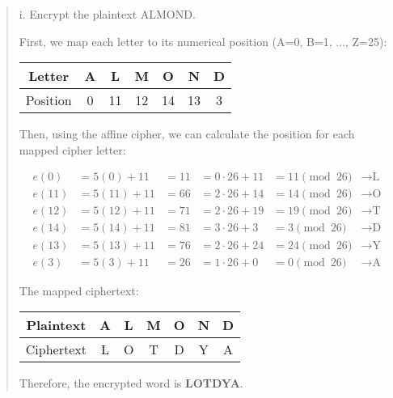 \documentclass[12pt]{article}
\begin{document}
\begin{quote}
i. Encrypt the plaintext ALMOND.

\vspace{0.3cm}

First, we map each letter to its numerical position (A=0, B=1, ..., Z=25):

\begin{center}
\begin{tabular}{|c|c|c|c|c|c|c|}
\hline
Letter & A & L & M & O & N & D \\
\hline
Position & 0 & 11 & 12 & 14 & 13 & 3 \\
\hline
\end{tabular}
\end{center}

\vspace{0.5cm}

Then, using the affine cipher, we can calculate the position for each mapped cipher letter:

\begin{align*}
e(0)  &= 5(0) + 11  &= 11 &= 0 \cdot 26 + 11 &= 11 \pmod{26} &\rightarrow \text{L}\\
e(11) &= 5(11) + 11 &= 66 &= 2 \cdot 26 + 14 &= 14 \pmod{26} &\rightarrow \text{O}\\
e(12) &= 5(12) + 11 &= 71 &= 2 \cdot 26 + 19 &= 19 \pmod{26} &\rightarrow \text{T}\\
e(14) &= 5(14) + 11 &= 81 &= 3 \cdot 26 + 3 &= 3 \pmod{26}  &\rightarrow \text{D}\\
e(13) &= 5(13) + 11 &= 76 &= 2 \cdot 26 + 24 &= 24 \pmod{26} &\rightarrow \text{Y}\\
e(3)  &= 5(3) + 11  &= 26 &= 1 \cdot 26 + 0 &= 0 \pmod{26}  &\rightarrow \text{A}
\end{align*}

\vspace{0.5cm}

The mapped ciphertext:

\begin{center}
\begin{tabular}{|c|c|c|c|c|c|c|}
\hline
Plaintext & A & L & M & O & N & D \\
\hline
Ciphertext & L & O & T & D & Y & A \\
\hline
\end{tabular}
\end{center}

\vspace{0.5cm}

Therefore, the encrypted word is \textbf{LOTDYA}.


\end{quote}
\end{document}

